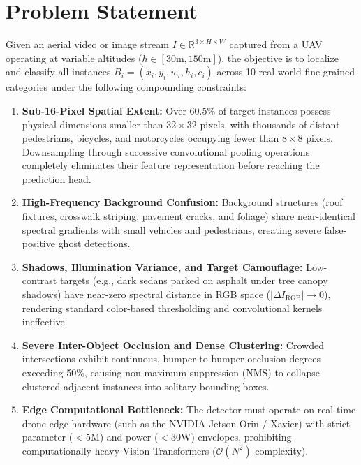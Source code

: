 \documentclass[12pt,a4paper]{report}
\begin{document}
\section{Problem Statement}
Given an aerial video or image stream $I \in \mathbb{R}^{3 \times H \times W}$ captured from a UAV operating at variable altitudes ($h \in [30\text{m}, 150\text{m}]$), the objective is to localize and classify all instances $B_i = (x_i, y_i, w_i, h_i, c_i)$ across 10 real-world fine-grained categories under the following compounding constraints:
\begin{enumerate}[leftmargin=2em]
    \item \textbf{Sub-16-Pixel Spatial Extent:} Over 60.5\% of target instances possess physical dimensions smaller than $32 \times 32$ pixels, with thousands of distant pedestrians, bicycles, and motorcycles occupying fewer than $8 \times 8$ pixels. Downsampling through successive convolutional pooling operations completely eliminates their feature representation before reaching the prediction head.
    \item \textbf{High-Frequency Background Confusion:} Background structures (roof fixtures, crosswalk striping, pavement cracks, and foliage) share near-identical spectral gradients with small vehicles and pedestrians, creating severe false-positive ghost detections.
    \item \textbf{Shadows, Illumination Variance, and Target Camouflage:} Low-contrast targets (e.g., dark sedans parked on asphalt under tree canopy shadows) have near-zero spectral distance in RGB space ($|\Delta I_{\text{RGB}}| \to 0$), rendering standard color-based thresholding and convolutional kernels ineffective.
    \item \textbf{Severe Inter-Object Occlusion and Dense Clustering:} Crowded intersections exhibit continuous, bumper-to-bumper occlusion degrees exceeding 50\%, causing non-maximum suppression (NMS) to collapse clustered adjacent instances into solitary bounding boxes.
    \item \textbf{Edge Computational Bottleneck:} The detector must operate on real-time drone edge hardware (such as the NVIDIA Jetson Orin / Xavier) with strict parameter ($<5\text{M}$) and power ($<30\text{W}$) envelopes, prohibiting computationally heavy Vision Transformers ($\mathcal{O}(N^2)$ complexity).
\end{enumerate}
\end{document}

